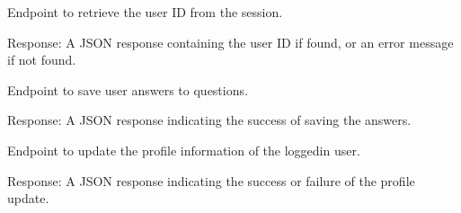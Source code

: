 \documentclass[letterpaper,10pt,english]{sphinxmanual}
\begin{document}

\begin{fulllineitems}
\label{\detokenize{routes.questionnaire:routes.questionnaire.routes.get_user_id}}
\pysigstartsignatures
{}
\pysigstopsignatures
\sphinxAtStartPar
Endpoint to retrieve the user ID from the session.
\begin{description}
\sphinxAtStartPar
Response: A JSON response containing the user ID if found, or an error message if not found.

\end{description}

\end{fulllineitems}


\begin{fulllineitems}
\label{\detokenize{routes.questionnaire:routes.questionnaire.routes.save_answers}}
\pysigstartsignatures
{}
\pysigstopsignatures
\sphinxAtStartPar
Endpoint to save user answers to questions.
\begin{description}
\sphinxAtStartPar
Response: A JSON response indicating the success of saving the answers.

\end{description}

\end{fulllineitems}


\begin{fulllineitems}
\label{\detokenize{routes.questionnaire:routes.questionnaire.routes.update_profile_info}}
\pysigstartsignatures
{}
\pysigstopsignatures
\sphinxAtStartPar
Endpoint to update the profile information of the logged\sphinxhyphen{}in user.
\begin{description}
\sphinxAtStartPar
Response: A JSON response indicating the success or failure of the profile update.

\end{description}

\end{fulllineitems}
\end{document}
